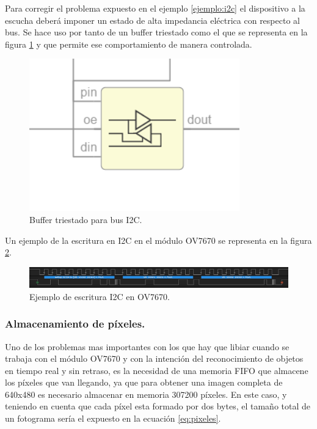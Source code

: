 Para corregir el problema expuesto en el ejemplo \ref{ejemplo:i2c} el dispositivo a la escucha deberá imponer un estado de alta impedancia eléctrica con respecto al bus. Se hace uso por tanto de un buffer triestado como el que se representa en la figura \ref{fig:buffer_triestado} y que permite ese comportamiento de manera controlada.
\begin{figure}[H]
	\center
	\includegraphics[scale=0.6, angle=0]{imagenes/Cuadricoptero_vision/triestado}
	\caption{Buffer triestado para bus I2C.}
	\label{fig:buffer_triestado}
\end{figure}

Un ejemplo de la escritura en I2C en el módulo OV7670 se representa en la figura \ref{fig:i2c_example}.

\begin{figure}[H]
	\center
	\includegraphics[scale=0.4, angle=0]{imagenes/Cuadricoptero_vision/i2c_example}
	\caption{Ejemplo de escritura I2C en OV7670.}
	\label{fig:i2c_example}
\end{figure}

\subsubsection{Almacenamiento de píxeles. }

Uno de los problemas mas importantes con los que hay que libiar cuando se trabaja con el módulo OV7670 y con la intención del reconocimiento de objetos en tiempo real y sin retraso, es la necesidad de una memoria FIFO que almacene los píxeles que van llegando, ya que para obtener una imagen completa de 640x480 es necesario almacenar en memoria 307200 píxeles. En este caso, y teniendo en cuenta que cada píxel esta formado por dos bytes, el tamaño total de un fotograma sería el expuesto en la ecuación \ref{eq:pixeles}.


